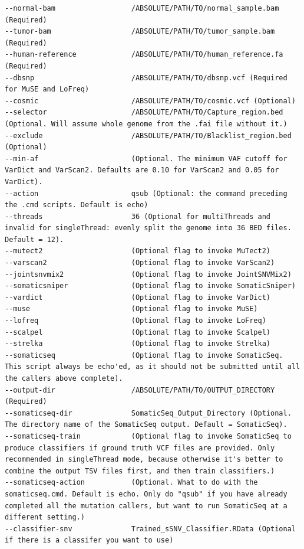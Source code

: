 \documentclass[10pt,letterpaper]{article}
\begin{document}
\begin{sloppypar}
\begin{lstlisting}
--normal-bam                  /ABSOLUTE/PATH/TO/normal_sample.bam (Required)
--tumor-bam                   /ABSOLUTE/PATH/TO/tumor_sample.bam  (Required)
--human-reference             /ABSOLUTE/PATH/TO/human_reference.fa (Required)
--dbsnp                       /ABSOLUTE/PATH/TO/dbsnp.vcf (Required for MuSE and LoFreq)
--cosmic                      /ABSOLUTE/PATH/TO/cosmic.vcf (Optional)
--selector                    /ABSOLUTE/PATH/TO/Capture_region.bed (Optional. Will assume whole genome from the .fai file without it.)
--exclude                     /ABSOLUTE/PATH/TO/Blacklist_region.bed (Optional)
--min-af                      (Optional. The minimum VAF cutoff for VarDict and VarScan2. Defaults are 0.10 for VarScan2 and 0.05 for VarDict).
--action                      qsub (Optional: the command preceding the .cmd scripts. Default is echo)
--threads                     36 (Optional for multiThreads and invalid for singleThread: evenly split the genome into 36 BED files. Default = 12).
--mutect2                     (Optional flag to invoke MuTect2)
--varscan2                    (Optional flag to invoke VarScan2)
--jointsnvmix2                (Optional flag to invoke JointSNVMix2)
--somaticsniper               (Optional flag to invoke SomaticSniper)
--vardict                     (Optional flag to invoke VarDict)
--muse                        (Optional flag to invoke MuSE)
--lofreq                      (Optional flag to invoke LoFreq)
--scalpel                     (Optional flag to invoke Scalpel)
--strelka                     (Optional flag to invoke Strelka)
--somaticseq                  (Optional flag to invoke SomaticSeq. This script always be echo'ed, as it should not be submitted until all the callers above complete).
--output-dir                  /ABSOLUTE/PATH/TO/OUTPUT_DIRECTORY (Required)
--somaticseq-dir              SomaticSeq_Output_Directory (Optional. The directory name of the SomaticSeq output. Default = SomaticSeq).
--somaticseq-train            (Optional flag to invoke SomaticSeq to produce classifiers if ground truth VCF files are provided. Only recommended in singleThread mode, because otherwise it's better to combine the output TSV files first, and then train classifiers.)
--somaticseq-action           (Optional. What to do with the somaticseq.cmd. Default is echo. Only do "qsub" if you have already completed all the mutation callers, but want to run SomaticSeq at a different setting.)
--classifier-snv              Trained_sSNV_Classifier.RData (Optional if there is a classifer you want to use)

\end{lstlisting}
\end{sloppypar}
\end{document}
